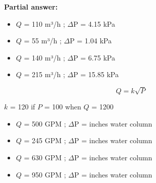 





\noindent
{\bf Partial answer:}

\begin{itemize}
\item{} $Q$ = 110 m³/h ; $\Delta$P = 4.15 kPa
\vskip 5pt
\item{} $Q$ = 55 m³/h ; $\Delta$P = 1.04 kPa
\vskip 5pt
\item{} $Q$ = 140 m³/h ; $\Delta$P = 6.75 kPa
\vskip 5pt
\item{} $Q$ = 215 m³/h ; $\Delta$P = 15.85 kPa
\end{itemize}







$$Q = k \sqrt{P}$$

$k$ = 120 if $P$ = 100 when $Q$ = 1200

\begin{itemize}
\item{} $Q$ = 500 GPM ; $\Delta$P =  inches water column
\item{} $Q$ = 245 GPM ; $\Delta$P =  inches water column
\item{} $Q$ = 630 GPM ; $\Delta$P =  inches water column
\item{} $Q$ = 950 GPM ; $\Delta$P =  inches water column
\end{itemize}





